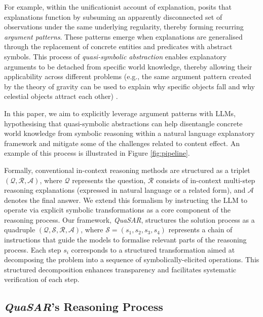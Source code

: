 \documentclass[11pt]{article}
\newcommand{\QuaSAR}{\emph{QuaSAR}\xspace}
\begin{document}
For example, within the unificationist account of explanation, \citet{kitcher1981explanatory} posits that explanations function by subsuming an apparently disconnected set of observations under the same underlying regularity, thereby forming recurring \emph{argument patterns}. These patterns emerge when explanations are generalised through the replacement of concrete entities and predicates with abstract symbols. This process of \emph{quasi-symbolic abstraction} enables explanatory arguments to be detached from specific world knowledge, thereby allowing their applicability across different problems (e.g., the same argument pattern created by the theory of gravity can be used to explain why specific objects fall and why celestial objects attract each other) \cite{valentino-etal-2021-unification,Valentino_Thayaparan_Ferreira_Freitas_2022,valentino-etal-2022-case,zheng2024take}.

In this paper, we aim to explicitly leverage argument patterns with LLMs, hypothesising that quasi-symbolic abstractions can help disentangle concrete world knowledge from symbolic reasoning within a natural language explanatory framework and mitigate some of the challenges related to content effect. An example of this process is illustrated in Figure \ref{fig:pipeline}.

Formally, conventional in-context reasoning methods are structured as a triplet $(\mathcal{Q}, \mathcal{R}, \mathcal{A})$, where $\mathcal{Q}$ represents the question, $\mathcal{R}$ consists of in-context multi-step reasoning explanations (expressed in natural language or a related form), and $\mathcal{A}$ denotes the final answer.
We extend this formalism by instructing the LLM to operate via explicit symbolic transformations as a core component of the reasoning process. Our framework, \QuaSAR, structures the solution process as a quadruple  $(\mathcal{Q}, \mathcal{S}, \mathcal{R}, \mathcal{A})$, where $\mathcal{S} = (s_1, s_2, s_3, s_4)$ represents a chain of instructions that guide the models to formalise relevant parts of the reasoning process. Each step $s_i$ corresponds to a structured transformation aimed at decomposing the problem into a sequence of symbolically-elicited operations. This structured decomposition enhances transparency and facilitates systematic verification of each step.

\subsection{\QuaSAR's Reasoning Process}
\label{sec:SiC_proces}
\end{document}
